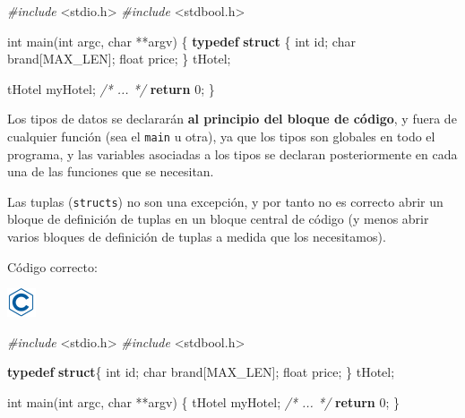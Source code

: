\documentclass[
]{book}
\newenvironment{Shaded}{\begin{snugshade}}{\end{snugshade}}
\newcommand{\CommentTok}[1]{\textcolor[rgb]{0.56,0.35,0.01}{\textit{#1}}}
\newcommand{\ControlFlowTok}[1]{\textcolor[rgb]{0.13,0.29,0.53}{\textbf{#1}}}
\newcommand{\DataTypeTok}[1]{\textcolor[rgb]{0.13,0.29,0.53}{#1}}
\newcommand{\DecValTok}[1]{\textcolor[rgb]{0.00,0.00,0.81}{#1}}
\newcommand{\ImportTok}[1]{#1}
\newcommand{\KeywordTok}[1]{\textcolor[rgb]{0.13,0.29,0.53}{\textbf{#1}}}
\newcommand{\NormalTok}[1]{#1}
\newcommand{\PreprocessorTok}[1]{\textcolor[rgb]{0.56,0.35,0.01}{\textit{#1}}}
\begin{document}
\begin{Shaded}
\begin{Highlighting}[]
\PreprocessorTok{\#include }\ImportTok{\textless{}stdio.h\textgreater{}}
\PreprocessorTok{\#include }\ImportTok{\textless{}stdbool.h\textgreater{}}

\DataTypeTok{int}\NormalTok{ main(}\DataTypeTok{int}\NormalTok{ argc, }\DataTypeTok{char}\NormalTok{ **argv) \{}
    \KeywordTok{typedef} \KeywordTok{struct}\NormalTok{ \{}
        \DataTypeTok{int}\NormalTok{ id;}
        \DataTypeTok{char}\NormalTok{ brand[MAX\_LEN];}
        \DataTypeTok{float}\NormalTok{ price;}
\NormalTok{    \} tHotel;}

\NormalTok{    tHotel myHotel;}
    \CommentTok{/* ... */}
    \ControlFlowTok{return} \DecValTok{0}\NormalTok{;}
\NormalTok{\}}
\end{Highlighting}
\end{Shaded}

Los tipos de datos se declararán \textbf{al principio del bloque de código}, y fuera de cualquier función (sea el \texttt{main} u otra), ya que los tipos son globales en todo el programa, y las variables asociadas a los tipos se declaran posteriormente en cada una de las funciones que se necesitan.

Las tuplas (\texttt{structs}) no son una excepción, y por tanto no es correcto abrir un bloque de definición de tuplas en un bloque central de código (y menos abrir varios bloques de definición de tuplas a medida que los necesitamos).

Código correcto:

\includegraphics{./img/c.png}

\begin{Shaded}
\begin{Highlighting}[]
\PreprocessorTok{\#include }\ImportTok{\textless{}stdio.h\textgreater{}}
\PreprocessorTok{\#include }\ImportTok{\textless{}stdbool.h\textgreater{}}

\KeywordTok{typedef} \KeywordTok{struct}\NormalTok{\{}
    \DataTypeTok{int}\NormalTok{ id;}
    \DataTypeTok{char}\NormalTok{ brand[MAX\_LEN];}
    \DataTypeTok{float}\NormalTok{ price;}
\NormalTok{\} tHotel;}

\DataTypeTok{int}\NormalTok{ main(}\DataTypeTok{int}\NormalTok{ argc, }\DataTypeTok{char}\NormalTok{ **argv) \{}
\NormalTok{    tHotel myHotel;}
    \CommentTok{/* ... */}
    \ControlFlowTok{return} \DecValTok{0}\NormalTok{;}
\NormalTok{\}}
\end{Highlighting}
\end{Shaded}
\end{document}
